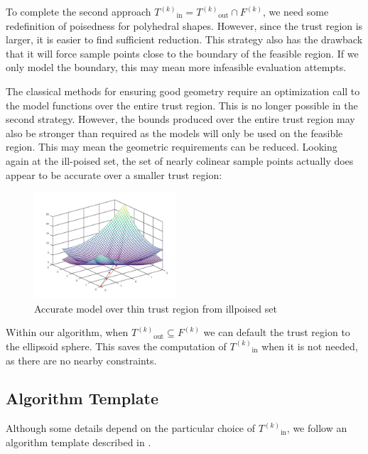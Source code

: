 \documentclass{article}
\theoremstyle{case}
\newcommand{\innertrk}{{T^{(k)}}_{\text{in}}}
\newcommand{\outertrk}{{T^{(k)}}_{\text{out}}}
\newcommand{\feasiblek}{{F}^{(k)}}
\begin{document}
 

To complete the second approach $\innertrk = \outertrk \cap \feasiblek$, we need some redefinition of poisedness for polyhedral shapes.
However, since the trust region is larger, it is easier to find sufficient reduction.
This strategy also has the drawback that it will force sample points close to the boundary of the feasible region.
If we only model the boundary, this may mean more infeasible evaluation attempts.

The classical methods for ensuring good geometry require an optimization call to the model functions over the entire trust region.
This is no longer possible in the second strategy.
However, the bounds produced over the entire trust region may also be stronger than required as the models will only be used on the feasible region.
This may mean the geometric requirements can be reduced.
Looking again at the ill-poised set, the set of nearly colinear sample points actually does appear to be accurate over a smaller trust region:


\begin{figure}[h]
    \centering
    \includegraphics[width=200px]{images/poised_bad_but_good.png}
    \caption{Accurate model over thin trust region from illpoised set}
    \label{aoip}
\end{figure}


Within our algorithm, when $ \outertrk \subseteq \feasiblek$ we can default the trust region to the ellipsoid sphere.
This saves the computation of $\innertrk$ when it is not needed, as there are no nearby constraints.

\subsection{Algorithm Template}

Although some details depend on the particular choice of $\innertrk$, we follow an algorithm template described in \cite{doi:10.1080/10556788.2015.1026968}.

\end{document}
